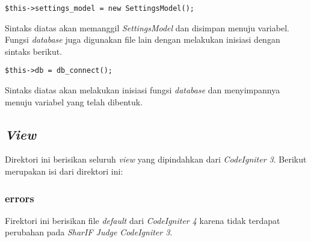 \begin{center}
\verb|$this->settings_model = new SettingsModel();|
\end{center}

Sintaks diatas akan memanggil \textit{SettingsModel} dan disimpan menuju variabel. Fungsi \textit{database} juga digunakan file lain dengan melakukan inisiasi dengan sintaks berikut.
\begin{center}
	\verb|$this->db = db_connect();|
\end{center}
Sintaks diatas akan melakukan inisiasi fungsi \textit{database} dan menyimpannya menuju variabel yang telah dibentuk.

\subsection{\textit{View}}
Direktori ini berisikan seluruh \textit{view} yang dipindahkan dari \textit{CodeIgniter 3}. Berikut merupakan isi dari direktori ini:
\subsubsection{errors}
Firektori ini berisikan file \textit{default} dari \textit{CodeIgniter 4} karena tidak terdapat perubahan pada \textit{SharIF Judge} \textit{CodeIgniter 3}.
